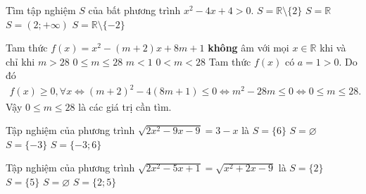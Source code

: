 \begin{ex}%
	Tìm tập nghiệm $S$ của bất phương trình $x^2-4x+4>0$.
	\choice
	{\True $S=\mathbb{R}\setminus \{2\}$}
	{$S=\mathbb{R}$}
	{$S=(2;+\infty)$}
	{$S=\mathbb{R}\setminus \{-2\}$}
\end{ex}

\begin{ex}%
	Tam thức $f(x)=x^2-(m+2)x+8m+1$ \textbf{không} âm với mọi $x \in \mathbb{R}$ khi và chỉ khi
	\choice
	{$m>28$}
	{\True $0\le m\le 28$}
	{$m<1$}
	{$0<m<28$}
	\loigiai
	{
		Tam thức $f(x)$ có $a=1>0$. Do đó
		\allowdisplaybreaks
		\begin{eqnarray*}
			f(x) \geq 0,\forall x \Leftrightarrow (m+2)^2-4(8m+1) \leq 0 \Leftrightarrow m^2-28m\leq 0 \Leftrightarrow 0\leq m\leq 28.
		\end{eqnarray*}
		Vậy $0\le m\le 28$ là các giá trị cần tìm.
	}
\end{ex}

\begin{ex}
	Tập nghiệm của phương trình $\sqrt{2 x^{2}-9 x-9}=3-x$ là
	\choice
	{$S=\{6\}$}
	{$S=\varnothing$}
	{\True $S=\{-3\}$}
	{$S=\{-3 ; 6\}$}
\end{ex}

\begin{ex}
	Tập nghiệm của phương trình $\sqrt{2 x^{2}-5 x+1}=\sqrt{x^{2}+2 x-9}$ là
	\choice
	{$S=\{2\}$}
	{\True $S=\{5\}$}
	{$S=\varnothing$}
	{$S=\{2 ; 5\}$}
\end{ex}

